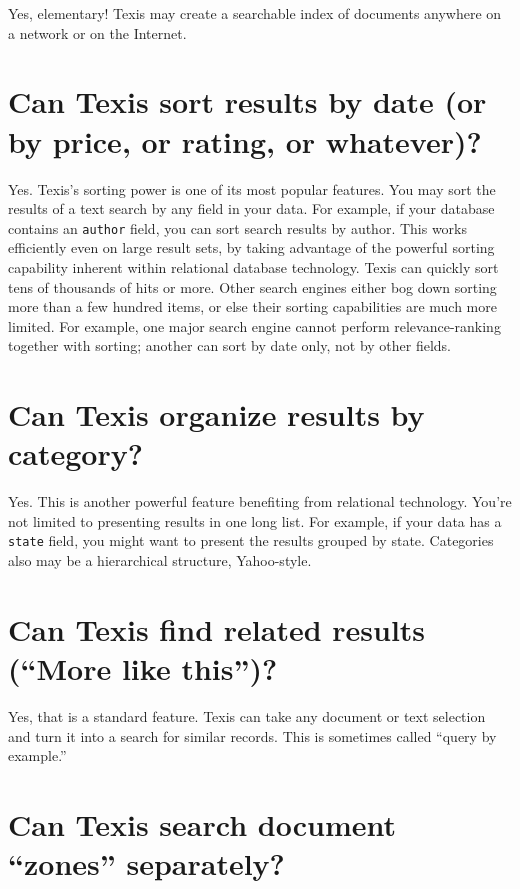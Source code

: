 Yes, elementary! Texis may create a searchable index of documents
anywhere on a network or on the Internet.

\section{Can Texis sort results by date (or by price, or rating, or whatever)? }

Yes. Texis's sorting power is one of its most popular features. You
may sort the results of a text search by any field in your data. For
example, if your database contains an {\tt author} field, you can sort
search results by author.  This works efficiently even on large result
sets, by taking advantage of the powerful sorting capability inherent
within relational database technology. Texis can quickly sort tens of
thousands of hits or more. Other search engines either bog down
sorting more than a few hundred items, or else their sorting
capabilities are much more limited. For example, one major search
engine cannot perform relevance-ranking together with sorting; another
can sort by date only, not by other fields.

\section{Can Texis organize results by category? }

Yes. This is another powerful feature benefiting from relational
technology. You're not limited to presenting results in one long
list. For example, if your data has a {\tt state} field, you might
want to present the results grouped by state. Categories also may be a
hierarchical structure, Yahoo-style.

\section{Can Texis find related results (``More like this'')? }

Yes, that is a standard feature. Texis can take any document or text
selection and turn it into a search for similar records. This is
sometimes called ``query by example.''

\section{Can Texis search document ``zones'' separately? }

